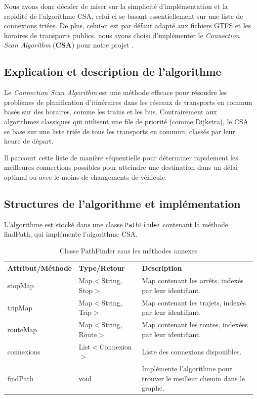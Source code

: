 \documentclass[12pt]{article}
\begin{document}
Nous avons donc décider de miser sur la simplicité d'implémentation et la rapidité de l'algorithme CSA, celui-ci
se basant essentiellement sur une liste de connexions triées. De plus, celui-ci est par défaut adapté aux fichiers GTFS et les horaires de transports publics.
nous avons choisi d'implémenter le \emph{Connection Scan Algorithm} (\textbf{CSA}) pour notre projet \cite{linkGTFSCSA}.

\subsection{Explication et description de l'algorithme}
Le \emph{Connection Scan Algorithm} est une méthode efficace pour résoudre les problèmes de planification d'itinéraires dans 
les réseaux de transports en commun basés sur des horaires, comme les trains et les bus. Contrairement aux algorithmes classiques 
qui utilisent une file de priorité (comme Dijkstra), le CSA se base sur une liste triée de tous les transports en commun, classés par 
leur heure de départ.

Il parcourt cette liste de manière séquentielle pour déterminer rapidement les meilleures connections possibles pour atteindre une 
destination dans un délai optimal ou avec le moins de changements de véhicule.

\subsection{Structures de l'algorithme et implémentation}
L'algorithme est stocké dans une classe \texttt{PathFinder} contenant la méthode findPath, qui implémente l'algorithme CSA.
\begin{table}[h]
  \centering
  \begin{tabular}{|l|l|p{8cm}|}
  \hline
  \textbf{Attribut/Méthode} & \textbf{Type/Retour} & \textbf{Description} \\
  \hline
  stopMap & Map$<$String, Stop$>$ & Map contenant les arrêts, indexés par leur identifiant. \\
  tripMap & Map$<$String, Trip$>$ & Map contenant les trajets, indexés par leur identifiant. \\
  routeMap & Map$<$String, Route$>$ & Map contenant les routes, indexées par leur identifiant. \\
  connexions & List$<$Connexion$>$ & Liste des connexions disponibles. \\
  \hline
  findPath & void & Implémente l'algorithme pour trouver le meilleur chemin dans le graphe. \\
  \hline
  \end{tabular}
  \caption{Classe PathFinder sans les méthodes annexes}
\end{table}
\end{document}
